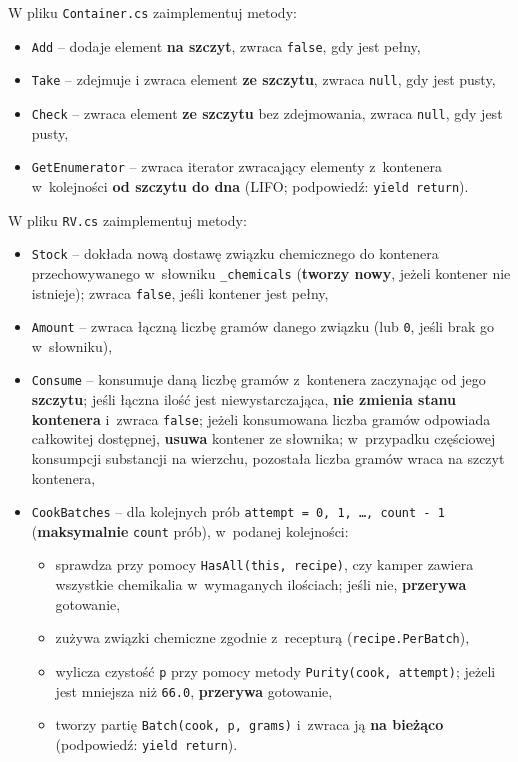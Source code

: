 \documentclass[11pt,a4paper,addpoints]{exam}
\renewcommand*\half{.5}
\begin{document}
\begin{questions}

\question[1\half] W pliku \texttt{Container.cs} zaimplementuj metody:
\begin{itemize}
    \item \texttt{Add} -- dodaje element \textbf{na szczyt}, zwraca \texttt{false}, gdy jest pełny,
    \item \texttt{Take} -- zdejmuje i zwraca element \textbf{ze szczytu}, zwraca \texttt{null}, gdy jest pusty,
    \item \texttt{Check} -- zwraca element \textbf{ze szczytu} bez zdejmowania, zwraca \texttt{null}, gdy jest pusty,
    \item \texttt{GetEnumerator} -- zwraca iterator zwracający elementy z~kontenera w~kolejności \textbf{od szczytu do dna} (LIFO; podpowiedź: \texttt{yield return}).
\end{itemize}

\question[2\half] W pliku \texttt{RV.cs} zaimplementuj metody:
\begin{itemize}
    \item \texttt{Stock} -- dokłada nową dostawę związku chemicznego do kontenera przechowywanego w~słowniku \texttt{\_chemicals} (\textbf{tworzy nowy}, jeżeli kontener nie istnieje); zwraca \texttt{false}, jeśli kontener jest pełny,
    \item \texttt{Amount} -- zwraca łączną liczbę gramów danego związku (lub \texttt{0}, jeśli brak go w~słowniku),
    \item \texttt{Consume} -- konsumuje daną liczbę gramów z~kontenera zaczynając od jego \textbf{szczytu}; jeśli łączna ilość jest niewystarczająca, \textbf{nie zmienia stanu kontenera} i~zwraca \texttt{false}; jeżeli konsumowana liczba gramów odpowiada całkowitej dostępnej, \textbf{usuwa} kontener ze słownika; w~przypadku częściowej konsumpcji substancji na wierzchu, pozostała liczba gramów wraca na szczyt kontenera,
    \item \texttt{CookBatches} -- dla kolejnych prób \texttt{attempt = 0, 1, \dots, count - 1} (\textbf{maksymalnie} \texttt{count} prób), w~podanej kolejności:
    \begin{itemize}
        \item sprawdza przy pomocy \texttt{HasAll(this, recipe)}, czy kamper zawiera wszystkie chemikalia w~wymaganych ilościach; jeśli nie, \textbf{przerywa} gotowanie,
        \item zużywa związki chemiczne zgodnie z~recepturą (\texttt{recipe.PerBatch}),
        \item wylicza czystość \texttt{p} przy pomocy metody \texttt{Purity(cook, attempt)}; jeżeli jest mniejsza niż \texttt{66.0}, \textbf{przerywa} gotowanie,
        \item tworzy partię \texttt{Batch(cook, p, grams)} i~zwraca ją \textbf{na bieżąco} (podpowiedź: \texttt{yield return}).
    \end{itemize}
\end{itemize}


\end{questions}
\end{document}
